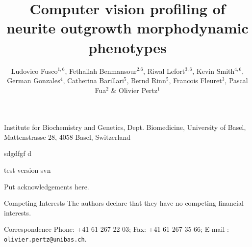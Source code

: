 \documentclass{nature}
\title{Computer vision profiling of neurite outgrowth morphodynamic phenotypes}
\author{Ludovico Fusco$^{1,6}$, Fethallah Benmansour$^{2. 6}$, Riwal Lefort$^{3, 6}$, Kevin Smith$^{4, 6}$, German Gonzales$^4$,  Catherina Barillari$^5$, Bernd Rinn$^5$, Francois Fleuret$^3$, Pascal Fua$^2$  \& Olivier Pertz$^1$}
\begin{document}
\maketitle

\begin{affiliations}
 \item Institute for Biochemistry and Genetics, Dept. Biomedicine, University of Basel, Mattenstrasse 28, 4058 Basel, Switzerland
 \item 
 \item 
 \item 
 \item 
 \item 
\end{affiliations}


sdgdfgf d

test version svn


\begin{results}







\end{results}




%
%


\begin{addendum}
 \item Put acknowledgements here.
 \item[Competing Interests] The authors declare that they have no
competing financial interests.
 \item[Correspondence] Phone: +41 61 267 22 03; Fax: +41 61 267 35 66; E-mail : \texttt{olivier.pertz@unibas.ch}.
\end{addendum}

\end{document}
